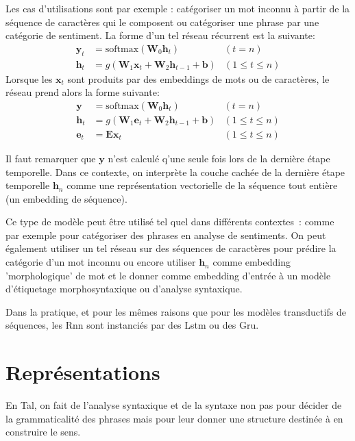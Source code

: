 \documentclass[11pt,openany]{book}
\begin{document}
Les cas d'utilisations sont par exemple : catégoriser un mot inconnu à
partir de la séquence de caractères qui le composent 
ou catégoriser une phrase par une catégorie de sentiment.
La forme d'un tel réseau récurrent est la suivante:
\begin{align*}
\mathbf{y}_t &= \text{softmax}(\mathbf{W}_0 \mathbf{h}_t) &(t = n)\\
\mathbf{h}_t &= g(\mathbf{W}_1\mathbf{x}_t + \mathbf{W}_2
\mathbf{h}_{t-1}+\mathbf{b} )& (1 \leq t \leq n)
\end{align*}
Lorsque les $\mathbf{x}_t$ sont produits par des embeddings de mots ou
de caractères, le réseau prend alors la forme suivante:
\begin{align*}
\mathbf{y} &= \text{softmax}(\mathbf{W}_0 \mathbf{h}_t) & (t = n)\\
\mathbf{h}_t &= g(\mathbf{W}_1\mathbf{e}_t + \mathbf{W}_2
\mathbf{h}_{t-1}+\mathbf{b} ) &(1 \leq t \leq n)\\
\mathbf{e}_t &= \mathbf{E}\mathbf{x}_t &  (1 \leq t \leq n)
\end{align*}

Il faut remarquer que $\mathbf{y}$ n'est calculé q'une seule fois lors de la dernière
étape temporelle. Dans ce contexte, on interprète la couche cachée de la dernière étape temporelle
$\mathbf{h}_n$ comme une représentation vectorielle de la séquence
tout entière (un
embedding de séquence).

Ce type de modèle peut être utilisé tel quel dans différents
contextes~: comme par exemple pour catégoriser des phrases en analyse de sentiments.
On peut également utiliser un tel réseau sur des séquences de
caractères pour prédire la catégorie d'un mot inconnu ou encore
utiliser $\mathbf{h}_n$ comme embedding 'morphologique' de mot et le
donner comme embedding d'entrée à un modèle d'étiquetage
morphosyntaxique ou d'analyse syntaxique.

Dans la pratique, et pour les mêmes raisons que pour les modèles transductifs de séquences, les {\sc
  Rnn} sont instanciés par des {\sc Lstm} ou des {\sc Gru}.


\chapter{Représentations}

En {\sc Tal}, on fait de l'analyse syntaxique et de la syntaxe non pas pour décider
de la grammaticalité des phrases mais pour leur donner une structure
destinée à en construire le sens.
\end{document}
